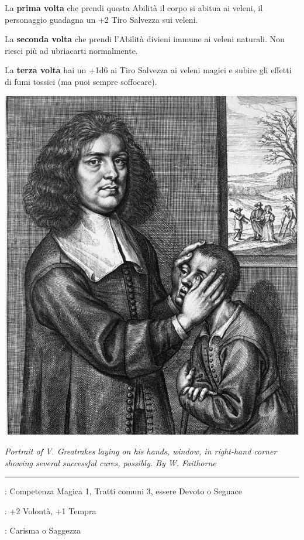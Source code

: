 \begin{multicols}{2}

La \textbf{prima volta} che prendi questa Abilità il corpo si abitua ai veleni, il personaggio guadagna un +2 Tiro Salvezza sui veleni.

La \textbf{seconda volta} che prendi l'Abilità divieni immune ai veleni naturali. Non riesci più ad ubriacarti normalmente.

La \textbf{terza volta} hai un +1d6 ai Tiro Salvezza ai veleni magici e subire gli effetti di fumi tossici (ma puoi sempre soffocare).

\medskip

\begin{center}
	\includegraphics[width=0.75\linewidth]{immagini/Portrait_of_V_Greatrakesv2.png}

	\emph{Portrait of V. Greatrakes laying on his hands, window, in right-hand corner showing several successful cures, possibly. By W. Faithorne }
\end{center}

\smallskip\noindent\rule{\linewidth}{2pt} \hypertarget{Imposizione delle mani}{}\medskip{}
\noindent
\begin{description}[noitemsep, topsep=0pt, parsep=0pt, partopsep=0pt, leftmargin=0cm, labelwidth=2.5cm]
    \item[\textbf{Requisito}]: Competenza Magica 1, Tratti comuni 3, essere Devoto o Seguace
    \item[\textbf{Tiri Salvezza}]: +2 Volontà, +1 Tempra
    \item[\textbf{Caratteristica}]: Carisma o Saggezza
\end{description}


\end{multicols}
